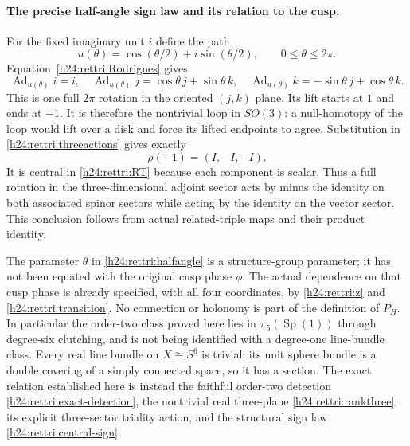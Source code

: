\paragraph{The precise half-angle sign law and its relation to the cusp.}
For the fixed imaginary unit $i$ define the path
\begin{equation}
 u(\theta)=\cos(\theta/2)+i\sin(\theta/2),
                   \qquad 0\le\theta\le2\pi.
 \label{h24:rettri:halfangle}
\end{equation}
Equation~\eqref{h24:rettri:Rodrigues} gives
\[
 \operatorname{Ad}_{u(\theta)}i=i,\quad
 \operatorname{Ad}_{u(\theta)}j=\cos\theta\,j+\sin\theta\,k,\quad
 \operatorname{Ad}_{u(\theta)}k=-\sin\theta\,j+\cos\theta\,k.
\]
This is one full $2\pi$ rotation in the oriented $(j,k)$ plane.
Its lift starts at $1$ and ends at $-1$. It is therefore the
nontrivial loop in $SO(3)$: a null-homotopy of the loop would
lift over a disk and force its lifted endpoints to agree.
Substitution in \eqref{h24:rettri:threeactions} gives exactly
\begin{equation}
 \rho(-1)=(I,-I,-I).
 \label{h24:rettri:central-sign}
\end{equation}
It is central in \eqref{h24:rettri:RT} because each component
is scalar. Thus a full rotation in the three-dimensional
adjoint sector acts by minus the identity on both associated
spinor sectors while acting by the identity on the vector
sector. This conclusion follows from actual related-triple
maps and their product identity.

The parameter $\theta$ in \eqref{h24:rettri:halfangle} is a
structure-group parameter; it has not been equated with the
original cusp phase $\phi$. The actual dependence on that cusp
phase is already specified, with all four coordinates, by
\eqref{h24:rettri:z} and \eqref{h24:rettri:transition}.
No connection or holonomy is part of the definition of $P_H$.
In particular the order-two class proved here lies in
$\pi_5(\operatorname{Sp}(1))$ through degree-six clutching,
and is not being identified with a degree-one line-bundle
class. Every real line bundle on $X\cong S^6$ is trivial:
its unit sphere bundle is a double covering of a simply
connected space, so it has a section. The exact relation
established here is instead the faithful order-two detection
\eqref{h24:rettri:exact-detection}, the nontrivial real
three-plane \eqref{h24:rettri:rankthree}, its explicit
three-sector triality action, and the structural sign law
\eqref{h24:rettri:central-sign}.


